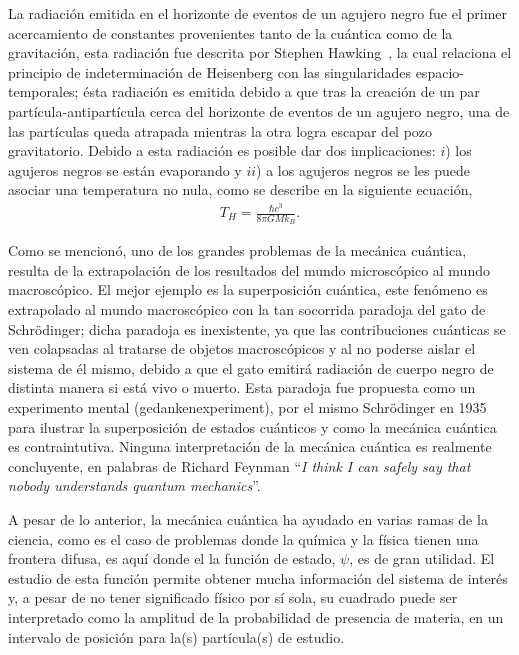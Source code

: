 La radiación emitida en el horizonte de eventos de un agujero negro fue el
primer acercamiento de constantes provenientes tanto de la cuántica como de la
gravitación, esta radiación fue descrita por Stephen
Hawking~\cite{HAWKING1974}, la cual relaciona el principio de indeterminación
de Heisenberg con las singularidades espacio-temporales; ésta radiación es
emitida debido a que tras la creación de un par partícula-antipartícula cerca
del horizonte de eventos de un agujero negro, una de las partículas queda
atrapada mientras la otra logra escapar del pozo gravitatorio. Debido a esta
radiación es posible dar dos implicaciones: $i$) los agujeros negros se están
evaporando y $ii$) a los agujeros negros se les puede asociar una temperatura
no nula, como se describe en la siguiente ecuación,
%
\begin{align}
T_{H} = \frac{\hbar c^{3}}{8\pi GM k_{B}}.
\end{align}

Como se mencionó, uno de los grandes problemas de la mecánica cuántica, resulta
de la extrapolación de los resultados del mundo microscópico al mundo
macroscópico. El mejor ejemplo es la superposición cuántica, este fenómeno es
extrapolado al mundo macroscópico con la tan socorrida paradoja del gato de
Schr\"odinger; dicha paradoja es inexistente, ya que las contribuciones
cuánticas se ven colapsadas al tratarse de objetos macroscópicos
y al no poderse aislar el sistema de él mismo, debido a que el gato emitirá
radiación de cuerpo negro de distinta manera si está vivo o muerto.
Esta paradoja fue propuesta como un experimento mental (gedankenexperiment),
por el mismo Schr\"odinger en 1935 para ilustrar la superposición de estados
cuánticos y como la mecánica cuántica es contraintutiva. Ninguna interpretación
de la mecánica cuántica es realmente concluyente, en palabras de Richard
Feynman ``{\em I think I can safely say that nobody understands quantum
mechanics}''.

A pesar de lo anterior, la mecánica cuántica ha ayudado en varias ramas de la
ciencia, como es el caso de problemas donde la química y la física tienen una
frontera difusa, es aquí donde el la función de estado, $\psi$, es de gran
utilidad. El estudio de esta función permite obtener mucha información del
sistema de interés y, a pesar de no tener significado físico por sí sola, su
cuadrado puede ser interpretado como la amplitud de la probabilidad de
presencia de materia, en un intervalo de posición para la(s) partícula(s) de
estudio.

